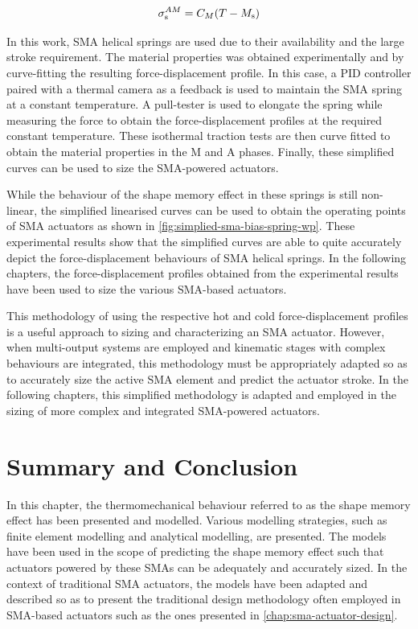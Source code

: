 \begin{equation}\label{eq:critical-M-stress}
    \sigma_\mathrm{s}^{AM} = C_M (T-M_\mathrm{s})
\end{equation}

In this work, SMA helical springs are used due to their availability and the large stroke requirement. The material properties was obtained experimentally and by curve-fitting the resulting force-displacement profile. In this case, a PID controller paired with a thermal camera as a feedback is used to maintain the SMA spring at a constant temperature. A pull-tester is used to elongate the spring while measuring the force to obtain the force-displacement profiles at the required constant temperature. These isothermal traction tests are then curve fitted to obtain the material properties in the M and A phases. Finally, these simplified curves can be used to size the SMA-powered actuators.

While the behaviour of the shape memory effect in these springs is still non-linear, the simplified linearised curves can be used to obtain the operating points of SMA actuators as shown in \cref{fig:simplied-sma-bias-spring-wp}. These experimental results show that the simplified curves are able to quite accurately depict the force-displacement behaviours of SMA helical springs. In the following chapters, the force-displacement profiles obtained from the experimental results have been used to size the various SMA-based actuators.

This methodology of using the respective hot and cold force-displacement profiles is a useful approach to sizing and characterizing an SMA actuator. However, when multi-output systems are employed and kinematic stages with complex behaviours are integrated, this methodology must be appropriately adapted so as to accurately size the active SMA element and predict the actuator stroke. In the following chapters, this simplified methodology is adapted and employed in the sizing of more complex and integrated SMA-powered actuators.

\section{Summary and Conclusion}
In this chapter, the thermomechanical behaviour referred to as the shape memory effect has been presented and modelled. Various modelling strategies, such as finite element modelling and analytical modelling, are presented. The models have been used in the scope of predicting the shape memory effect such that actuators powered by these SMAs can be adequately and accurately sized. In the context of traditional SMA actuators, the models have been adapted and described so as to present the traditional design methodology often employed in SMA-based actuators such as the ones presented in \cref{chap:sma-actuator-design}.

